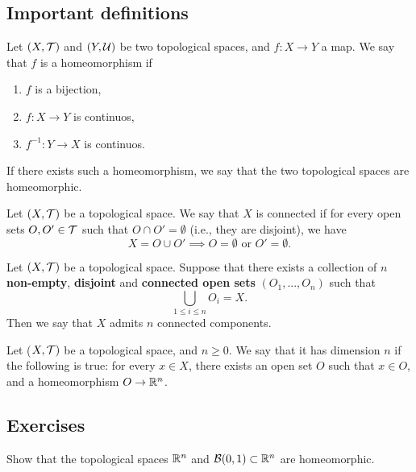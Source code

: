 \subsection{Important definitions}

\begin{definition}
    Let $(X, \mathcal{T})$ and $(Y, \mathcal{U})$ be two topological spaces, and $f : X
    \to Y$ a map. We say that $f$ is a homeomorphism if
    \begin{enumerate}
        \item $f$ is a bijection, 
        \item $f : X \to Y$ is continuos, 
        \item $f^{-1} : Y \to X$ is continuos.
    \end{enumerate}
    If there exists such a homeomorphism, we say that the two topological
    spaces are homeomorphic.
\end{definition}

\begin{definition}
    Let $(X, \mathcal{T})$ be a topological space. We say that $X$ is connected if for
    every open sets $O, O' \in \mathcal{T}$ such that $O \cap O' = \emptyset$ (i.e.,
    they are disjoint), we have
    $$X = O \cup O' \implies O = \emptyset \text{ or } O' = \emptyset.$$
\end{definition}

\begin{definition}
    Let $(X, \mathcal{T})$ be a topological space. Suppose that there exists a
    collection of $n$ \textbf{non-empty}, \textbf{disjoint} and
    \textbf{connected open sets} $(O_1, ..., O_n)$ such that
    $$
    \bigcup_{1 \le i \le n} O_i = X.
    $$
    Then we say that $X$ admits $n$ connected components.
\end{definition}

\begin{definition}
    Let ($X, \mathcal{T})$ be a topological space, and $n \geq 0$. We say that it has
    dimension $n$ if the following is true: for every $x \in X$, there exists
    an open set $O$ such that $x \in O$, and a homeomorphism $O \to \mathbb{R}^n$.
\end{definition}

\subsection{Exercises}

\begin{exercise}
    Show that the topological spaces $\mathbb{R}^n$ and $\mathcal{B}(0, 1) \subset \mathbb{R}^n$ are homeomorphic.
\end{exercise}

